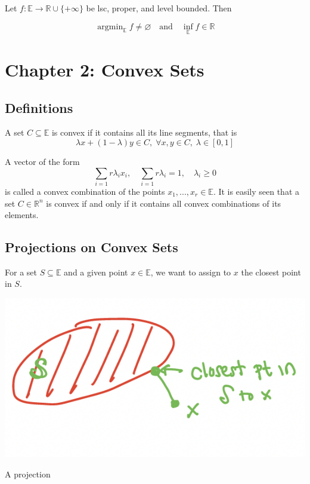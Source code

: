\documentclass{tufte-handout}
\DeclareMathOperator{\argmin}{argmin}
\begin{document}
{\begin{theorem} \label{label}
  Let $f : \mathbb{E} \to \mathbb{R}\cup \{+\infty\}$ be lsc, proper, and level bounded. Then 

  $$\argmin_{\mathbb{E}} f \neq \varnothing \quad \text{and} \quad \inf_{\mathbb{E}} f \in \mathbb{R}$$
\end{theorem}
\section{Chapter 2: Convex Sets}
\subsection{Definitions}%
  \label{sub:Name}
  
\begin{definition}
  A set $C \subseteq \mathbb{E}$ is convex if it contains all its line segments, that is 
  $$\lambda x + (1 - \lambda )y \in C , \; \forall x,y \in C, \; \lambda \in [0,1] $$
  
\end{definition}
\begin{definition}
  A vector of the form 
  $$\sum_{i = 1}{ r} \lambda _i x_i, \quad \sum_{i =1 }{r} \lambda_i = 1,  \quad \lambda_i \geq 0 $$
is called a convex combination of the points $x_1,..., x_r \in \mathbb{E}$. It is easily seen that a set $C \in \mathbb{R}^n$ is convex if and only if it contains all convex combinations of its elements.
\end{definition}
\subsection{Projections on Convex Sets}%
  \label{sub:Projections on Convex Sets}
For a set $S\subseteq \mathbb{E}$ and a given point $x \in \mathbb{E}$, we want to assign to $x$ the closest point in $S.$ \begin{marginfigure}
  \includegraphics{projection}
  \caption{A projection}
\end{marginfigure}

}
\end{document}
